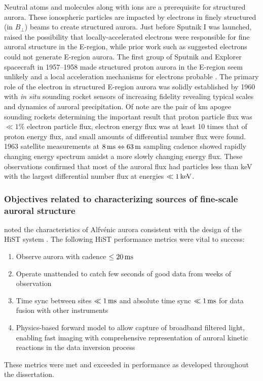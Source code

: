 Neutral atoms and molecules along with ions are a prerequisite for structured aurora.
These ionospheric particles are impacted by electrons in finely structured (in $B_\perp$) beams to create structured aurora.
Just before Sputnik I was launched, \citet{chamberlain1957} raised the possibility that locally-accelerated electrons were responsible for fine auroral structure in the E-region, while prior work such as \citet{seaton1954} suggested electrons could not generate E-region aurora.
The first group of Sputnik and Explorer spacecraft in 1957--1958 made structured proton aurora in the E-region seem unlikely and a local acceleration mechanisms for electrons probable \citep{krassovsky1959,wallace1959}.
The primary role of the electron in structured E-region aurora was solidly established by 1960 with \textit{in situ} sounding rocket sensors of increasing fidelity revealing typical scales and dynamics of auroral precipitation.
Of note are the pair of \unit[120]{km} apogee sounding rockets \citep{mcilwain1960} determining the important result that proton particle flux was $\ll 1\%$ electron particle flux, electron energy flux was at least 10 times that of proton energy flux, and small amounts of differential number flux were found.
1963 satellite measurements \citep{sharp1965} at $\unit[8]{ms} \Leftrightarrow \unit[63]{m}$ sampling cadence showed rapidly changing energy spectrum amidst a more slowly changing energy flux.
These observations confirmed that most of the auroral flux had particles less than \unit[10]{keV} with the largest differential number flux at energies $\ll \unit[1]{keV}$.

\subsubsection{Objectives related to characterizing sources of fine-scale auroral structure}
\citet{chaston2007how} noted the characteristics of Alfvénic aurora consistent with the design of the HiST system \citep{hirsch2016}.
The following HiST performance metrics were vital to success:
\begin{enumerate}
	\item Observe aurora with cadence $\leq\unit[20]{ms}$
	\item Operate unattended to catch few seconds of good data from weeks of observation
	\item Time sync between sites $\ll \unit[1]{ms}$ and absolute time sync $\ll\unit[1]{ms}$ for data fusion with other instruments
	\item Physics-based forward model to allow capture of broadband filtered light, enabling fast imaging with comprehensive representation of auroral kinetic reactions in the data inversion process
\end{enumerate}
These metrics were met and exceeded in performance as developed throughout the dissertation.